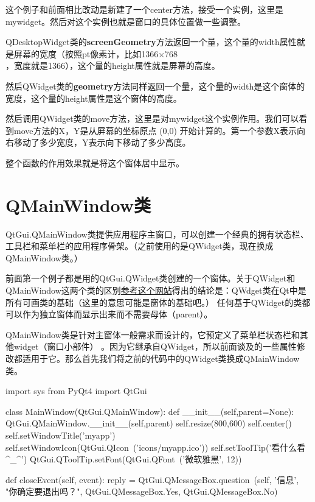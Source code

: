 \documentclass[12pt,oneside]{book}
\begin{document}
\begin{common-format}
这个例子和前面相比改动是新建了一个center方法，接受一个实例，这里是mywidget。然后对这个实例也就是窗口的具体位置做一些调整。

QDesktopWidget类的\textbf{screenGeometry}方法返回一个量，这个量的width属性就是屏幕的宽度（按照pt像素计，比如1366×768\\，宽度就是1366），这个量的height属性就是屏幕的高度。

然后QWidget类的\textbf{geometry}方法同样返回一个量，这个量的width是这个窗体的宽度，这个量的height属性是这个窗体的高度。

然后调用QWidget类的move方法，这里是对mywidget这个实例作用。我们可以看到move方法的X，Y是从屏幕的坐标原点 (0,0) 开始计算的。第一个参数X表示向右移动了多少宽度，Y表示向下移动了多少高度。

整个函数的作用效果就是将这个窗体居中显示。


\section{QMainWindow类}
QtGui.QMainWindow类提供应用程序主窗口，可以创建一个经典的拥有状态栏、工具栏和菜单栏的应用程序骨架。（之前使用的是QWidget类，现在换成QMainWindow类。）

前面第一个例子都是用的QtGui.QWidget类创建的一个窗体。关于QWidget和QMainWindow这两个类的区别\href{http://stackoverflow.com/questions/3298792/whats-the-difference-between-qmainwindow-and-qwidget-and-qdialog}{参考这个网站}得出的结论是：QWdget类在Qt中是所有可画类的基础（这里的意思可能是窗体的基础吧。） 任何基于QWidget的类都可以作为独立窗体而显示出来而不需要母体（parent）。

QMainWindow类是针对主窗体一般需求而设计的，它预定义了菜单栏状态栏和其他widget（窗口小部件） 。因为它继承自QWidget，所以前面谈及的一些属性修改都适用于它。那么首先我们将之前的代码中的QWidget类换成QMainWindow类。



\begin{tcbpython}
import sys
from PyQt4  import QtGui

class MainWindow(QtGui.QMainWindow):
    def __init__(self,parent=None):
        QtGui.QMainWindow.__init__(self,parent)
        self.resize(800,600)
        self.center()
        self.setWindowTitle('myapp')
        self.setWindowIcon(QtGui.QIcon\
        ('icons/myapp.ico'))
        self.setToolTip('看什么看^_^')
        QtGui.QToolTip.setFont(QtGui.QFont\
        ('微软雅黑', 12))

    def closeEvent(self, event):
        reply = QtGui.QMessageBox.question\
        (self, '信息',
            "你确定要退出吗？",
             QtGui.QMessageBox.Yes,
             QtGui.QMessageBox.No)


\end{tcbpython}
\end{common-format}
\end{document}
